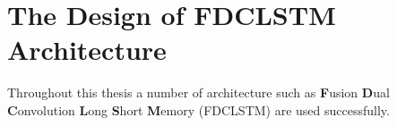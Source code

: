 \chapter{The Design of FDCLSTM Architecture}

Throughout this thesis a number of architecture such as \textbf{F}usion \textbf{D}ual \textbf{C}onvolution \textbf{L}ong \textbf{S}hort \textbf{M}emory (FDCLSTM) are used successfully.















\noindent{\bf{}}